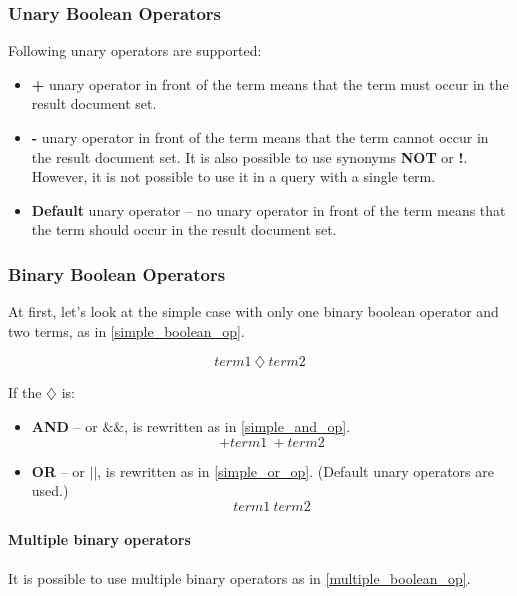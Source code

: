\subsubsection{Unary Boolean Operators}
Following unary operators are supported:
\begin{itemize}
    \item \textbf{+} unary operator in front of the term means that the term must occur in the result document set.
    \item \textbf{-} unary operator in front of the term means that the term cannot occur in the result document set.
    It is also possible to use synonyms \textbf{NOT} or \textbf{!}. However, it is not possible to use it in a query
    with a single term.
    \item \textbf{Default} unary operator – no unary operator in front of the term means that the term should occur
    in the result document set.
\end{itemize}

\subsubsection{Binary Boolean Operators}

At first, let's look at the simple case with only one binary boolean operator and two terms, as in \ref{simple_boolean_op}.

\begin{equation}
\label{simple_boolean_op}
term1\ \diamondsuit \ term2
\end{equation}

If the $\diamondsuit$ is:
\begin{itemize}
    \item \textbf{AND} – or $\&\&$, is rewritten as in \ref{simple_and_op}.
    \begin{equation}
    \label{simple_and_op}
    +term1\ +term2
    \end{equation}
    \item \textbf{OR} – or $\vert\vert$, is rewritten as in \ref{simple_or_op}. (Default unary operators are used.)
    \begin{equation}
    \label{simple_or_op}
    term1\ term2
    \end{equation}
\end{itemize}

\paragraph{Multiple binary operators}
It is possible to use multiple binary operators as in \ref{multiple_boolean_op}.


